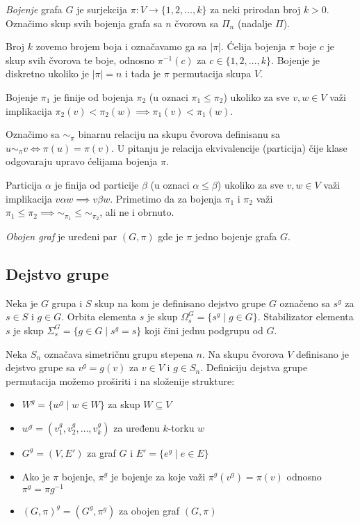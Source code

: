 \documentclass[12pt,oneside]{memoir}
\theoremstyle{definition}
\begin{document}
   \emph{Bojenje} grafa $G$ je surjekcija $\pi : V \to \{1, 2, \dots, k\}$ za
   neki prirodan broj $k > 0$. Označimo skup svih bojenja grafa sa $n$ čvorova
   sa $\Pi_n$ (nadalje $\Pi$).

   Broj $k$ zovemo brojem boja i označavamo ga sa $|\pi|$.  Ćelija bojenja $\pi$
   boje $c$ je skup svih čvorova te boje, odnosno $\pi^{-1}(c)$ za $c \in \{1,
   2, ..., k\}$.  Bojenje je diskretno ukoliko je $|\pi| = n$ i tada je $\pi$
   permutacija skupa $V$.

   Bojenje $\pi_1$ je finije od bojenja $\pi_2$ (u oznaci $\pi_1 \leq \pi_2$)
   ukoliko za sve $v, w \in V$ važi implikacija $\pi_2(v) < \pi_2(w) \implies
   \pi_1(v) < \pi_1(w)$.

   Označimo sa $\sim_\pi$ binarnu relaciju na skupu čvorova definisanu sa $u
   \sim_\pi v \iff \pi(u) = \pi(v)$. U pitanju je relacija ekvivalencije
   (particija) čije klase odgovaraju upravo ćelijama bojenja $\pi$.

   Particija $\alpha$ je finija od particije $\beta$ (u oznaci $\alpha \leq
   \beta$) ukoliko za sve $v, w \in V$ važi implikacija $v \alpha w \implies v
   \beta w$. Primetimo da za bojenja $\pi_1$ i $\pi_2$ važi $\pi_1 \leq \pi_2
   \implies \sim_{\pi_1} \leq \sim_{\pi_2}$, ali ne i obrnuto.

   \emph{Obojen graf} je uređeni par $(G, \pi)$ gde je $\pi$ jedno bojenje
   grafa $G$.


   \subsection{Dejstvo grupe}

   Neka je $G$ grupa i $S$ skup na kom je definisano dejstvo grupe $G$ označeno
   sa $s^g$ za $s \in S$ i $g \in G$. Orbita elementa $s$ je skup $\Omega_s^G =
   \{s^g \mid g \in G\}$.  Stabilizator elementa $s$ je skup $\Sigma_s^G = \{g
   \in G \mid s^g=s\}$ koji čini jednu podgrupu od $G$.

   Neka $S_n$ označava simetričnu grupu stepena $n$. Na skupu čvorova $V$
   definisano je dejstvo grupe sa $v^g = g(v)$ za $v \in V$ i $g \in S_n$.
   Definiciju dejstva grupe permutacija možemo proširiti i na složenije
   strukture:
   \begin{itemize}
       \item $W^g = \{w^g \mid w \in W\}$ za skup $W \subseteq V$
       \item $w^g = (v_1^g, v_2^g, \dots, v_k^g)$ za uređenu $k$-torku $w$
       \item $G^g = (V, E')$ za graf $G$ i $E' = \{e^g \mid e \in E\}$
       \item Ako je $\pi$ bojenje, $\pi^g$ je bojenje za koje važi
		   $\pi^g(v^g)=\pi(v)$ odnosno $\pi^g=\pi g^{-1}$
       \item $(G, \pi)^g = (G^g, \pi^g)$ za obojen graf $(G, \pi)$
   \end{itemize}
\end{document}
